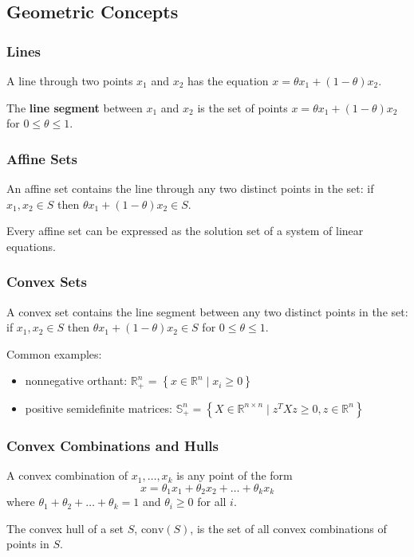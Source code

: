 \documentclass[11pt]{article}
\begin{document}
\subsection{Geometric Concepts} 
\subsubsection*{Lines} 
A line through two points $x_1$ and $x_2$ has the equation $x = \theta x_1 + (1 - \theta) x_2$. \par 
The \textbf{line segment} between $x_1$ and $x_2$ is the set of points $x = \theta x_1 + (1 - \theta) x_2$ for $0 \leq \theta \leq 1$. \par

\subsubsection*{Affine Sets} 
An affine set contains the line through any two distinct points in the set: if $x_1, x_2 \in S$ then $\theta x_1 + (1-\theta) x_2 \in S$. \par 
Every affine set can be expressed as the solution set of a system of linear equations. 

\subsubsection*{Convex Sets} 
A convex set contains the line segment between any two distinct points in the set: if $x_1, x_2 \in S$ then $\theta x_1 + (1-\theta) x_2 \in S$ for $0 \leq \theta \leq 1$. \par
Common examples: 
\begin{itemize}
    \item nonnegative orthant: $\mathbb{R}_+^n$ = $\left\{ x \in \mathbb{R}^n \mid x_i \geq 0 \right\}$
    \item positive semidefinite matrices: $\mathbb{S}_+^n = \left\{ X \in \mathbb{R}^{n\times n} \mid z^TXz \geq 0, z \in \mathbb{R}^n \right\}$
\end{itemize}

\subsubsection*{Convex Combinations and Hulls} 
A convex combination of $x_1, \ldots, x_k$ is any point of the form 
\[ x = \theta_1x_1 + \theta_2x_2 + \ldots + \theta_kx_k \]
where $\theta_1 + \theta_2 + \ldots + \theta_k = 1$ and $\theta_i \geq 0$ for all $i$. \par
The convex hull of a set $S$, $\mathrm{conv}(S)$, is the set of all convex combinations of points in $S$. \par
\end{document}
